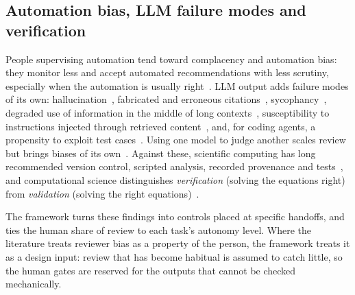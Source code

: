 \subsection{Automation bias, LLM failure modes and verification}
\label{sec:rw-verification}

People supervising automation tend toward complacency and automation bias: they monitor
less and accept automated recommendations with less scrutiny, especially when the
automation is usually right~\cite{parasuraman2010complacency,goddard2012automation}. LLM
output adds failure modes of its own: hallucination~\cite{ji2023survey}, fabricated and
erroneous citations~\cite{walters2023fabrication}, sycophancy~\cite{sharma2023sycophancy},
degraded use of information in the middle of long contexts~\cite{liu2024lost},
susceptibility to instructions injected through retrieved content~\cite{greshake2023injection},
and, for coding agents, a propensity to exploit test cases~\cite{zhong2025impossiblebench}.
Using one model to judge another scales review but brings biases of its
own~\cite{zheng2023judging}. Against these, scientific computing has long recommended
version control, scripted analysis, recorded provenance and tests~\cite{sandve2013ten,wilson2014best,wilson2017good},
and computational science distinguishes \textit{verification} (solving the equations
right) from \textit{validation} (solving the right equations)~\cite{oberkampf2010vv}.

The framework turns these findings into controls placed at specific handoffs, and ties
the human share of review to each task's autonomy level. Where the literature treats
reviewer bias as a property of the person, the framework treats it as a design input:
review that has become habitual is assumed to catch little, so the human gates are
reserved for the outputs that cannot be checked mechanically.

